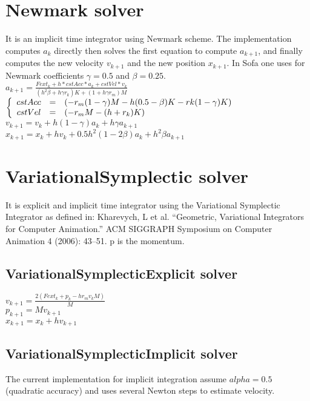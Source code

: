 \documentclass[12pt]{article}
\begin{document}
\begin{doublespace}
\section{Newmark solver}
It is an implicit time integrator using Newmark scheme.
The implementation computes $a_{k}$ directly then solves the first equation to compute $a_{k+1}$, and finally computes the new velocity $v_{k+1}$ and the new position $x_{k+1}$. In Sofa one uses for Newmark coefficients $\gamma=0.5$ and $\beta=0.25$.
\\$ a_{k+1} = \frac{Fext_{k} + h*cstAcc*a_{k}+cstVel*v_{k}}{(h^2\beta + h\gamma r_{k})K+(1+h\gamma r_{m})M} $
$\left\{
\begin{array}{r c l}
cstAcc &=& (-r_{m}(1-\gamma)M-h(0.5-\beta)K-rk(1-\gamma)K)\\
cstVel &=& (-r_{m}M-(h+r_{k})K)
\end{array}
\right.$
\\$ v_{k+1} = v_{k}+h(1-\gamma)a_{k}+h\gamma a_{k+1} $
\\$ x_{k+1} = x_{k}+hv_{k}+0.5h^2(1-2\beta)a_{k}+h^2\beta a_{k+1} $

\section{VariationalSymplectic solver}
It is explicit and implicit time integrator using the Variational Symplectic Integrator as defined in: Kharevych, L et al. “Geometric, Variational Integrators for Computer Animation.” ACM SIGGRAPH Symposium on Computer Animation 4 (2006): 43–51. p is the momentum.

\subsection{VariationalSymplecticExplicit solver}

$ v_{k+1} = \frac{2(Fext_{k}+p_{k}-hr_{m}v_{k}M)}{M} $
\\$ p_{k+1} = Mv_{k+1} $
\\$ x_{k+1} = x_{k}+hv_{k+1} $

\subsection{VariationalSymplecticImplicit solver}
The current implementation for implicit integration assume $alpha=0.5$ (quadratic accuracy) and uses several Newton steps to estimate velocity.
%
%
%
%
%
%


\end{doublespace}
\end{document}
